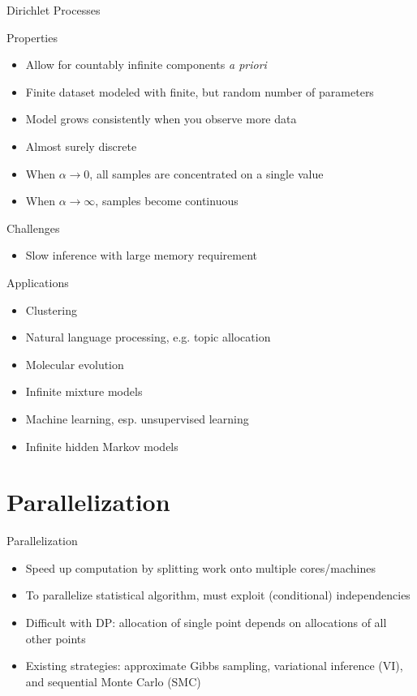 \documentclass{beamer}
\begin{document}
  \begin{frame}{Dirichlet Processes}
    \begin{block}{Properties}
      \begin{itemize}
        \item Allow for countably infinite components \emph{a priori}
        \item Finite dataset modeled with finite, but random number of parameters
        \item Model grows consistently when you observe more data
        \item Almost surely discrete
        \item When $\alpha \to 0$, all samples are concentrated on a single value
        \item When $\alpha \to \infty$, samples become continuous
      \end{itemize}
    \end{block}
    \begin{block}{Challenges}
      \begin{itemize}
        \item Slow inference with large memory requirement
      \end{itemize}
    \end{block}
  \end{frame}

  \begin{frame}{Applications}
    \begin{itemize}
      \item Clustering
      \item Natural language processing, e.g. topic allocation
      \item Molecular evolution
      \item Infinite mixture models
      \item Machine learning, esp. unsupervised learning
      \item Infinite hidden Markov models
    \end{itemize}
  \end{frame}

  \section{Parallelization}

  \begin{frame}{Parallelization}
    \begin{itemize}
      \item Speed up computation by splitting work onto multiple cores/machines
      \item To parallelize statistical algorithm, must exploit (conditional) independencies
      \item Difficult with DP: allocation of single point depends on allocations of all other points
      \item Existing strategies: approximate Gibbs sampling, variational inference (VI), and sequential Monte Carlo (SMC)
    \end{itemize}
  \end{frame}
\end{document}
